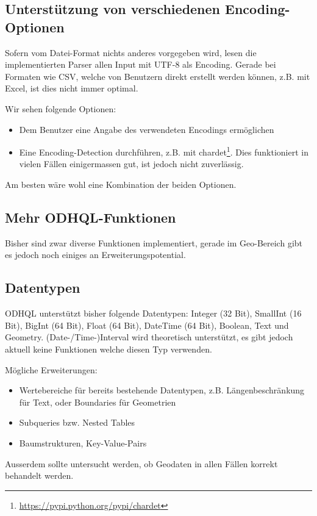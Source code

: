 \subsection{Unterstützung von verschiedenen Encoding-Optionen}
Sofern vom Datei-Format nichts anderes vorgegeben wird, lesen die implementierten Parser allen Input mit UTF-8 als Encoding. Gerade bei Formaten wie CSV, welche von Benutzern direkt erstellt werden können, z.B. mit Excel, ist dies nicht immer optimal.

Wir sehen folgende Optionen:
\begin{itemize}
\item Dem Benutzer eine Angabe des verwendeten Encodings ermöglichen
\item Eine Encoding-Detection durchführen, z.B. mit chardet\footnote{\url{https://pypi.python.org/pypi/chardet}}. Dies funktioniert in vielen Fällen einigermassen gut, ist jedoch nicht zuverlässig.
\end{itemize}

Am besten wäre wohl eine Kombination der beiden Optionen.

\subsection{Mehr ODHQL-Funktionen}
Bisher sind zwar diverse Funktionen implementiert, gerade im Geo-Bereich gibt es jedoch noch einiges an Erweiterungspotential.

\subsection{Datentypen}
ODHQL unterstützt bisher folgende Datentypen: Integer (32 Bit), SmallInt (16 Bit), BigInt (64 Bit), Float (64 Bit), DateTime (64 Bit), Boolean, Text und Geometry. (Date-/Time-)Interval wird theoretisch unterstützt, es gibt jedoch aktuell keine Funktionen welche diesen Typ verwenden.

Mögliche Erweiterungen:
\begin{itemize}
\item Wertebereiche für bereits bestehende Datentypen, z.B. Längenbeschränkung für Text, oder Boundaries für Geometrien
\item Subqueries bzw. Nested Tables
\item Baumstrukturen, Key-Value-Pairs
\end{itemize}

Ausserdem sollte untersucht werden, ob Geodaten in allen Fällen korrekt behandelt werden.

